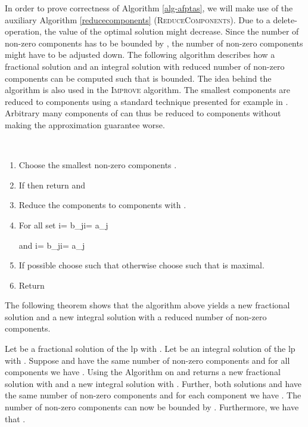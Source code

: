 In order to prove correctness of Algorithm \ref{alg-afptas}, we will make use of the auxiliary Algorithm \ref{reducecomponents} (\textsc{ReduceComponents}). Due to a delete-operation, the value of the optimal solution  might decrease. Since the number of non-zero components has to be bounded by , the number of non-zero components might have to be adjusted down. The following algorithm describes how a fractional solution  and an integral solution  with reduced number of non-zero components can be computed such that  is bounded. The idea behind the algorithm is also used in the \textsc{Improve} algorithm. The smallest  components are reduced to  components using a standard technique presented for example in \cite{beling1998}. Arbitrary many components of  can thus be reduced to  components without making the approximation guarantee worse.
\begin{algo}\label{reducecomponents}
\ 
  \begin{enumerate}
  \item Choose the smallest non-zero components .
  \item If  then return  and 
  
  \item Reduce the components  to  components  with .
  \item For all  set i= b_ji= a_j 
	 
	
    and i= b_ji= a_j
  \item If possible choose  such that  otherwise
  choose  such that  is maximal.
  \item Return 
  \end{enumerate}
\end{algo}
The following theorem shows that the algorithm above yields a new fractional solution  and a new integral solution  with a reduced number of non-zero components.
\begin{theorem}
\label{thm:reduce}
    Let  be a fractional solution of the \ac{lp} with	. Let  be an integral solution of the \ac{lp} with . Suppose  and  have the same number  of non-zero components and for all components  we have
	.	Using the Algorithm  on  and  returns a new fractional solution  with  and a new integral solution  with . Further, both solutions  and  have the same number of non-zero components and for each component we have . The number of non-zero components can now be bounded by . Furthermore, we have that .
\end{theorem}
